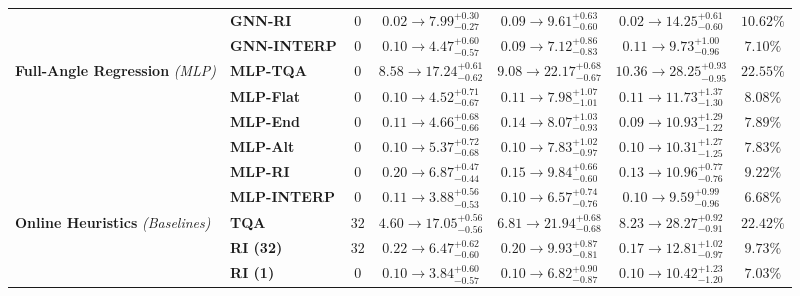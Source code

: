 \documentclass{article}
\theoremstyle{plain}
\theoremstyle{definition}
\begin{document}
\begin{table}[htbp]
{\begin{tabular}{llccccc}
 & \textbf{GNN-RI} & $0$ & $0.02 \rightarrow\allowbreak 7.99^{+0.30}_{-0.27}$ & $0.09 \rightarrow\allowbreak 9.61^{+0.63}_{-0.60}$ & $0.02 \rightarrow\allowbreak 14.25^{+0.61}_{-0.60}$ & $10.62\%$ \\
 & \textbf{GNN-INTERP} & $0$ & $0.10 \rightarrow\allowbreak 4.47^{+0.60}_{-0.57}$ & $0.09 \rightarrow\allowbreak 7.12^{+0.86}_{-0.83}$ & $0.11 \rightarrow\allowbreak 9.73^{+1.00}_{-0.96}$ & $7.10\%$ \\
\midrule
\textbf{Full-Angle Regression} \emph{(MLP)} & \textbf{MLP-TQA} & $0$ & $8.58 \rightarrow\allowbreak 17.24^{+0.61}_{-0.62}$ & $9.08 \rightarrow\allowbreak 22.17^{+0.68}_{-0.67}$ & $10.36 \rightarrow\allowbreak 28.25^{+0.93}_{-0.95}$ & $22.55\%$ \\
 & \textbf{MLP-Flat} & $0$ & $0.10 \rightarrow\allowbreak 4.52^{+0.71}_{-0.67}$ & $0.11 \rightarrow\allowbreak 7.98^{+1.07}_{-1.01}$ & $0.11 \rightarrow\allowbreak 11.73^{+1.37}_{-1.30}$ & $8.08\%$ \\
 & \textbf{MLP-End} & $0$ & $0.11 \rightarrow\allowbreak 4.66^{+0.68}_{-0.66}$ & $0.14 \rightarrow\allowbreak 8.07^{+1.03}_{-0.93}$ & $0.09 \rightarrow\allowbreak 10.93^{+1.29}_{-1.22}$ & $7.89\%$ \\
 & \textbf{MLP-Alt} & $0$ & $0.10 \rightarrow\allowbreak 5.37^{+0.72}_{-0.68}$ & $0.10 \rightarrow\allowbreak 7.83^{+1.02}_{-0.97}$ & $0.10 \rightarrow\allowbreak 10.31^{+1.27}_{-1.25}$ & $7.83\%$ \\
 & \textbf{MLP-RI} & $0$ & $0.20 \rightarrow\allowbreak 6.87^{+0.47}_{-0.44}$ & $0.15 \rightarrow\allowbreak 9.84^{+0.66}_{-0.60}$ & $0.13 \rightarrow\allowbreak 10.96^{+0.77}_{-0.76}$ & $9.22\%$ \\
 & \textbf{MLP-INTERP} & $0$ & $0.11 \rightarrow\allowbreak 3.88^{+0.56}_{-0.53}$ & $0.10 \rightarrow\allowbreak 6.57^{+0.74}_{-0.76}$ & $0.10 \rightarrow\allowbreak 9.59^{+0.99}_{-0.96}$ & $6.68\%$ \\
\midrule
\textbf{Online Heuristics} \emph{(Baselines)} & \textbf{TQA} & $32$ & $4.60 \rightarrow\allowbreak 17.05^{+0.56}_{-0.56}$ & $6.81 \rightarrow\allowbreak 21.94^{+0.68}_{-0.68}$ & $8.23 \rightarrow\allowbreak 28.27^{+0.92}_{-0.91}$ & $22.42\%$ \\
 & \textbf{RI (32)} & $32$ & $0.22 \rightarrow\allowbreak 6.47^{+0.62}_{-0.60}$ & $0.20 \rightarrow\allowbreak 9.93^{+0.87}_{-0.81}$ & $0.17 \rightarrow\allowbreak 12.81^{+1.02}_{-0.97}$ & $9.73\%$ \\
 & \textbf{RI (1)} & $0$ & $0.10 \rightarrow\allowbreak 3.84^{+0.60}_{-0.57}$ & $0.10 \rightarrow\allowbreak 6.82^{+0.90}_{-0.87}$ & $0.10 \rightarrow\allowbreak 10.42^{+1.23}_{-1.20}$ & $7.03\%$ \\
\bottomrule
\end{tabular}%
}
\vskip -0.02in
\end{table}
\end{document}
